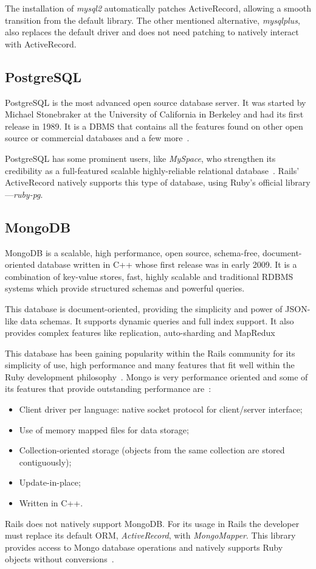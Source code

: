 The installation of \textit{mysql2} automatically patches ActiveRecord, allowing a smooth transition from the default library. The other mentioned alternative, \textit{mysqlplus}, also replaces the default driver and does not need patching to natively interact with ActiveRecord.


\subsection{PostgreSQL}
PostgreSQL is the most advanced open source database server. It was started by Michael Stonebraker at the University of California in Berkeley and had its first release in 1989. It is a DBMS that contains all the features found on other open source or commercial databases and a few more~\cite{beginning_postgresql}.

PostgreSQL has some prominent users, like \textit{MySpace}, who strengthen its credibility as a full-featured scalable highly-reliable relational database~\cite{petabyte_warehouses}. Rails' ActiveRecord natively supports this type of database, using Ruby's official library---\textit{ruby-pg}.


\subsection{MongoDB}
MongoDB is a scalable, high performance, open source, schema-free, document-oriented database written in C++ whose first release was in early 2009. It is a combination of key-value stores, fast, highly scalable and traditional RDBMS systems which provide structured schemas and powerful queries.

This database is document-oriented, providing the simplicity and power of JSON-like data schemas. It supports dynamic queries and full index support. It also provides complex features like replication, auto-sharding and MapRedux~\cite{mongodb}

This database has been gaining popularity within the Rails community for its simplicity of use, high performance and many features that fit well within the Ruby development philosophy~\cite{mongodb_rails}. Mongo is very performance oriented and some of its features that provide outstanding performance are~\cite{mongodb_couchdb}:
\begin{itemize}
  \item Client driver per language: native socket protocol for client/server interface;
  \item Use of memory mapped files for data storage;
  \item Collection-oriented storage (objects from the same collection are stored contiguously);
  \item Update-in-place;
  \item Written in C++.
\end{itemize}
Rails does not natively support MongoDB. For its usage in Rails the developer must replace its default ORM, \textit{ActiveRecord}, with \textit{MongoMapper}. This library provides access to Mongo database operations and natively supports Ruby objects without conversions~\cite{mongomapper}.


